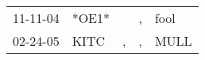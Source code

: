 \begin{supertabular}{lllll}
 11-11-04 &  *OE1* &    &  , &  fool \\
 02-24-05 &   KITC &  , &  , &  MULL \\
\end{supertabular}
